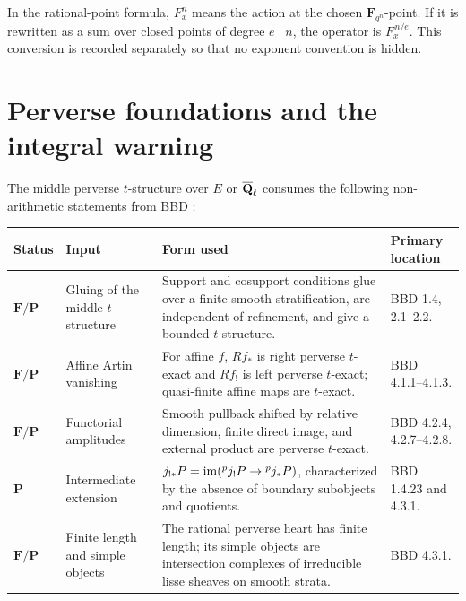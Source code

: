 In the rational-point formula, \(F_x^n\) means the action at the chosen
\(\mathbf F_{q^n}\)-point.  If it is rewritten as a sum over closed points
of degree \(e\mid n\), the operator is \(F_x^{\,n/e}\).  This conversion is
recorded separately so that no exponent convention is hidden.

\section{Perverse foundations and the integral warning}

The middle perverse \(t\)-structure over \(E\) or \(\overline{\mathbf Q}_\ell\) consumes the
following non-arithmetic statements from BBD \cite{BBD}:

\begin{longtable}{@{}
 >{\raggedright\arraybackslash}p{}
 >{\raggedright\arraybackslash}p{}
 >{\raggedright\arraybackslash}p{}
 >{\raggedright\arraybackslash}p{}@{}}
\toprule
Status & Input & Form used & Primary location\\
\midrule
\endhead
\(\mathbf F/\mathbf P\) &
Gluing of the middle \(t\)-structure &
Support and cosupport conditions glue over a finite smooth
stratification, are independent of refinement, and give a bounded
\(t\)-structure. &
BBD 1.4, 2.1--2.2.\\

\(\mathbf F/\mathbf P\) &
Affine Artin vanishing &
For affine \(f\), \(Rf_*\) is right perverse \(t\)-exact and \(Rf_!\) is
left perverse \(t\)-exact; quasi-finite affine maps are \(t\)-exact. &
BBD 4.1.1--4.1.3.\\

\(\mathbf F/\mathbf P\) &
Functorial amplitudes &
Smooth pullback shifted by relative dimension, finite direct image, and
external product are perverse \(t\)-exact. &
BBD 4.2.4, 4.2.7--4.2.8.\\

\(\mathbf P\) &
Intermediate extension &
\(j_{!*}P=\operatorname{im}({}^pj_!P\to{}^pj_*P)\), characterized by the absence of
boundary subobjects and quotients. &
BBD 1.4.23 and 4.3.1.\\

\(\mathbf F/\mathbf P\) &
Finite length and simple objects &
The rational perverse heart has finite length; its simple objects are
intersection complexes of irreducible lisse sheaves on smooth strata. &
BBD 4.3.1.\\
\bottomrule
\end{longtable}

